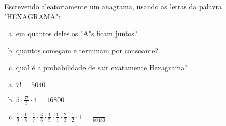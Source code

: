 \begin{ex}
 Escrevendo aleatoriamente um anagrama, usando as letras da palavra "HEXAGRAMA":
    \begin{enumerate}[(a)]
    \item em quantos deles os "A"s ficam juntos?
    \item quantos começam e terminam por consoante?
    \item qual é a probabilidade de sair exatamente Hexagrama?
    \end{enumerate}
      \begin{sol}
      \phantom{A}
        \begin{enumerate} [(a)]
            \item $7!=5040$
            \item $5\cdot\frac{7!}{3}\cdot4 = 16800$
            \item $\frac{1}{9}\cdot\frac{1}{8}\cdot\frac{1}{7}\cdot\frac{3}{6}\cdot\frac{1}{5}\cdot\frac{1}{4}\cdot\frac{2}{3}\cdot\frac{1}{2}\cdot1=\frac{1}{60480}$
        \end{enumerate}
      
      \end{sol}
      
\end{ex}